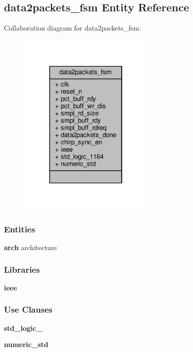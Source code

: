 \subsection{data2packets\+\_\+fsm Entity Reference}
\label{classdata2packets__fsm}


Collaboration diagram for data2packets\+\_\+fsm\+:\nopagebreak
\begin{figure}[H]
\begin{center}
\leavevmode
\includegraphics[width=190pt]{df/d3e/classdata2packets__fsm__coll__graph}
\end{center}
\end{figure}
\subsubsection*{Entities}
\begin{DoxyCompactItemize}
\item 
{\bf arch} architecture
\end{DoxyCompactItemize}
\subsubsection*{Libraries}
 \begin{DoxyCompactItemize}
\item 
{\bf ieee} 
\end{DoxyCompactItemize}
\subsubsection*{Use Clauses}
 \begin{DoxyCompactItemize}
\item 
{\bf std\+\_\+logic\+\_}   
\item 
{\bf numeric\+\_\+std}   
\end{DoxyCompactItemize}

